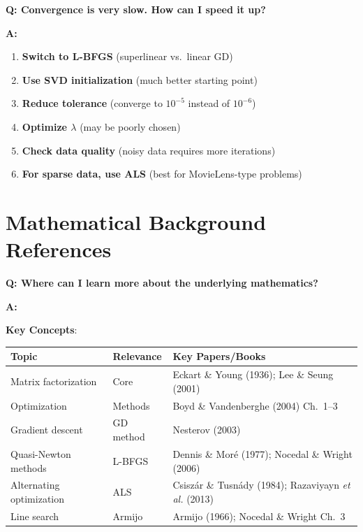 \documentclass[11pt,oneside]{article}
\newcommand{\question}[1]{\textbf{Q: #1}}
\newcommand{\answer}{\textbf{A: }}
\begin{document}
\medskip

\question{Convergence is very slow. How can I speed it up?}

\answer

\begin{enumerate}
    \item \textbf{Switch to L-BFGS} (superlinear vs.\ linear GD)
    \item \textbf{Use SVD initialization} (much better starting point)
    \item \textbf{Reduce tolerance} (converge to $10^{-5}$ instead of $10^{-6}$)
    \item \textbf{Optimize $\lambda$} (may be poorly chosen)
    \item \textbf{Check data quality} (noisy data requires more iterations)
    \item \textbf{For sparse data, use ALS} (best for MovieLens-type problems)
\end{enumerate}

\section{Mathematical Background References}\label{sec:references}

\question{Where can I learn more about the underlying mathematics?}

\answer

\textbf{Key Concepts}:

\begin{table}[h]
\centering
\small
\begin{tabular}{lll}
\toprule
\textbf{Topic} & \textbf{Relevance} & \textbf{Key Papers/Books} \\
\midrule
Matrix factorization & Core & Eckart \& Young (1936); Lee \& Seung (2001) \\
Optimization & Methods & Boyd \& Vandenberghe (2004) Ch.\ 1--3 \\
Gradient descent & GD method & Nesterov (2003) \\
Quasi-Newton methods & L-BFGS & Dennis \& Moré (1977); Nocedal \& Wright (2006) \\
Alternating optimization & ALS & Csiszár \& Tusnády (1984); Razaviyayn \textit{et al.} (2013) \\
Line search & Armijo & Armijo (1966); Nocedal \& Wright Ch.\ 3 \\
\bottomrule
\end{tabular}
\end{table}
\end{document}
